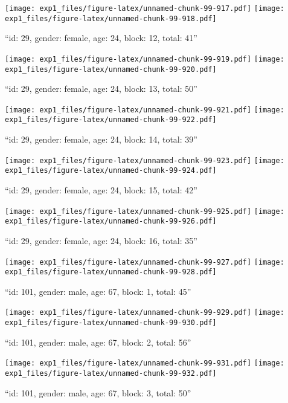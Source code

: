 \documentclass[,]{article}
\begin{document}
\texttt{[image: exp1\_files/figure-latex/unnamed-chunk-99-917.pdf]}
\texttt{[image: exp1\_files/figure-latex/unnamed-chunk-99-918.pdf]}

\newpage
[1] 

``id: 29, gender: female, age: 24, block: 12, total: 41''

\texttt{[image: exp1\_files/figure-latex/unnamed-chunk-99-919.pdf]}
\texttt{[image: exp1\_files/figure-latex/unnamed-chunk-99-920.pdf]}

\newpage
[1] 

``id: 29, gender: female, age: 24, block: 13, total: 50''

\texttt{[image: exp1\_files/figure-latex/unnamed-chunk-99-921.pdf]}
\texttt{[image: exp1\_files/figure-latex/unnamed-chunk-99-922.pdf]}

\newpage
[1] 

``id: 29, gender: female, age: 24, block: 14, total: 39''

\texttt{[image: exp1\_files/figure-latex/unnamed-chunk-99-923.pdf]}
\texttt{[image: exp1\_files/figure-latex/unnamed-chunk-99-924.pdf]}

\newpage
[1] 

``id: 29, gender: female, age: 24, block: 15, total: 42''

\texttt{[image: exp1\_files/figure-latex/unnamed-chunk-99-925.pdf]}
\texttt{[image: exp1\_files/figure-latex/unnamed-chunk-99-926.pdf]}

\newpage
[1] 

``id: 29, gender: female, age: 24, block: 16, total: 35''

\texttt{[image: exp1\_files/figure-latex/unnamed-chunk-99-927.pdf]}
\texttt{[image: exp1\_files/figure-latex/unnamed-chunk-99-928.pdf]}

\newpage
[1] 

``id: 101, gender: male, age: 67, block: 1, total: 45''

\texttt{[image: exp1\_files/figure-latex/unnamed-chunk-99-929.pdf]}
\texttt{[image: exp1\_files/figure-latex/unnamed-chunk-99-930.pdf]}

\newpage
[1] 

``id: 101, gender: male, age: 67, block: 2, total: 56''

\texttt{[image: exp1\_files/figure-latex/unnamed-chunk-99-931.pdf]}
\texttt{[image: exp1\_files/figure-latex/unnamed-chunk-99-932.pdf]}

\newpage
[1] 

``id: 101, gender: male, age: 67, block: 3, total: 50''
\end{document}
